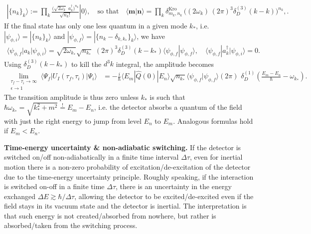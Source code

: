 \documentclass[../QFT_main.tex]{subfiles}
\begin{document}
\begin{mytheorem}
\begin{align}
    |\{n_k\}_k\rangle := \prod_k \frac{\big(\sqrt{2\omega_k}\,\,a_k^\dagger\big)^{n_k}}{\sqrt{n_k!}} |0\rangle,\quad \text{so that}\quad \langle \mathbf{m} |\mathbf{n}\rangle = \prod_k \delta^{\mathrm{Kro}}_{m_k,n_k}\,\Big((2\omega_k)\, (2\pi)^3 \delta_D^{(3)}(k\!-\!k)\Big)^{n_k},.
\end{align}
If the final state has only one less quantum in a given mode $k_*$, i.e. $|\psi_{\phi,i}\rangle = |\{n_k\}_k\rangle$ and $|\psi_{\phi,f}\rangle = |\{n_k - \delta_{k,k_*}\}_k\rangle$, we have
\begin{align}
    \langle \psi_{\phi,f} | a_{k}| \psi_{\phi,i}\rangle = \sqrt{2\omega_{k_*}}\sqrt{n_{k_*}} \,\,(2\pi)^3 \delta_D^{(3)}(k-k_*) \langle \psi_{\phi,f} | \psi_{\phi,f}\rangle,\quad \langle \psi_{\phi,f} | a_{k}^\dagger| \psi_{\phi,i}\rangle=0.
\end{align}
Using $\delta_D^{(3)}(k-k_*)$ to kill the $d^3k$ integral, the amplitude becomes
\begin{align}
    \lim_{\substack{\tau_f-\tau_i \to \infty \\ \epsilon\to 1}} \langle\Psi_f | U_I(\tau_f,\tau_i) | \Psi_i\rangle &=
    - \frac{i}{\hbar}\langle E_m | \hat{Q}(0) | E_n \rangle  \sqrt{n_{k_*}} \langle \psi_{\phi,f} | \psi_{\phi,f}\rangle(2\pi)\,\,\delta_D^{(1)}\!\!\left(\tfrac{E_{m}-E_n}{\hbar}-\omega_{k_*}\right).
\end{align}
The transition amplitude is thus zero unless $k_*$ is such that $\hbar \omega_{k_*} = \sqrt{k_*^2+m^2} \overset{!}{=} E_m - E_n$, i.e. the detector absorbs a quantum of the field with just the right energy to jump from level $E_n$ to $E_m$. 
Analogous formulas hold if $E_m < E_n$.
\medskip

\noindent
\textbf{Time-energy uncertainty \& non-adiabatic switching.}
If the detector is switched on/off non-adiabatically in a finite time interval $\Delta\tau$, even for inertial motion there is a non-zero probability of excitation/de-excitation of the detector due to the time-energy uncertainty principle.
Roughly speaking, if the interaction is switched on-off in a finite time $\Delta \tau$, there is an uncertainty in the energy exchanged $\Delta E \gtrsim \hbar/\Delta \tau$, allowing the detector to be excited/de-excited even if the field stays in its vacuum state and the detector is inertial.
The interpretation is that such energy is not created/absorbed from nowhere, but rather is absorbed/taken from the switching process.


\end{mytheorem}
\end{document}
